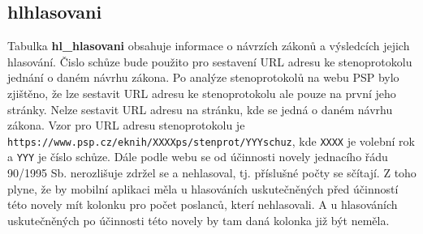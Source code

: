 \subsection*{hl\textunderscore hlasovani}
\label{subsec:hl-hlasovani}

Tabulka \textbf{hl\_hlasovani} obsahuje informace o návrzích zákonů a výsledcích jejich hlasování. Čislo schůze bude použito pro sestavení URL adresu ke stenoprotokolu jednání o daném návrhu zákona. Po analýze stenoprotokolů na webu PSP bylo zjištěno, že lze sestavit URL adresu ke stenoprotokolu ale pouze na první jeho stránky. Nelze sestavit URL adresu na \linebreak stránku, kde se jedná o daném návrhu zákona. Vzor pro URL adresu stenoprotokolu je \linebreak \lstinline|https://www.psp.cz/eknih/XXXXps/stenprot/YYYschuz|, kde \lstinline|XXXX| je volební rok a \lstinline|YYY| je číslo schůze. Dále podle webu se od účinnosti novely jednacího řádu 90/1995 Sb. nerozlišuje zdržel se a nehlasoval, tj. příslušné počty se sčítají. Z toho plyne, že by mobilní aplikaci měla u hlasováních uskutečněných před účinností této novely mít kolonku pro počet poslanců, kterí nehlasovali. A u hlasováních uskutečněných po účinnosti této novely by tam daná kolonka již být neměla.

\newpage

